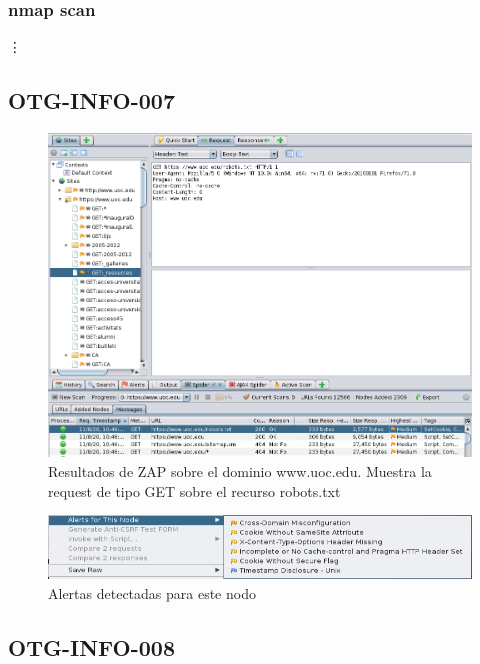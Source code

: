 \documentclass[10pt,a4paper]{article}
\begin{document}
\pagebreak
\subsubsection{nmap scan}
\label{ann:nmap}

\vdots


\pagebreak
\subsection{OTG-INFO-007}
\label{ann:otg-info-007}
\begin{figure}[h!]
  \centering
  \includegraphics[scale=0.4]{zap1.png}
  \caption{Resultados de ZAP sobre el dominio www.uoc.edu. Muestra la request de tipo GET sobre el recurso robots.txt}
  \label{fig:otg-info-007-1}
\end{figure}

\begin{figure}[h!]
  \centering
  \includegraphics[scale=0.4]{zap2.png}
  \caption{Alertas detectadas para este nodo}
  \label{fig:otg-info-007-2}
\end{figure}

\subsection{OTG-INFO-008}
\label{ann:otg-info-008}
\end{document}
